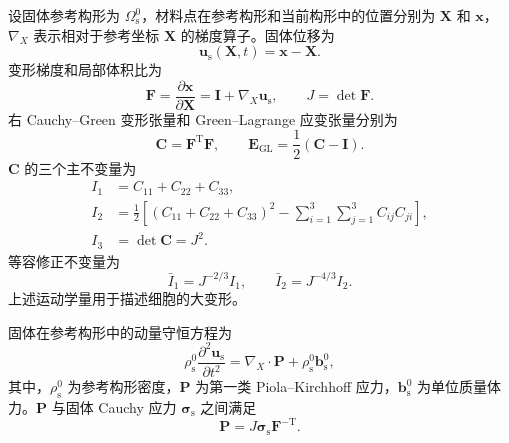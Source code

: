设固体参考构形为 $\Omega_{\mathrm s}^0$，材料点在参考构形和当前构形中的位置分别为 $\boldsymbol{X}$ 和 $\boldsymbol{x}$，$\nabla_{\!X}$ 表示相对于参考坐标 $\boldsymbol{X}$ 的梯度算子。固体位移为
\begin{equation}
\boldsymbol{u}_{\mathrm s}(\boldsymbol{X},t)
=
\boldsymbol{x}-\boldsymbol{X}.
\label{eq:ch2_solid_motion}
\end{equation}
变形梯度和局部体积比为
\begin{equation}
\boldsymbol{F}
=
\frac{\partial\boldsymbol{x}}{\partial\boldsymbol{X}}
=
\boldsymbol{I}
+
\nabla_{\!X}\boldsymbol{u}_{\mathrm s},
\qquad
J=\det\boldsymbol{F}.
\label{eq:ch2_deformation_gradient}
\end{equation}
右 Cauchy--Green 变形张量和 Green--Lagrange 应变张量分别为
\begin{equation}
\boldsymbol{C}
=
\boldsymbol{F}^{\mathrm T}\boldsymbol{F},
\qquad
\boldsymbol{E}_{\mathrm{GL}}
=
\frac{1}{2}\left(\boldsymbol{C}-\boldsymbol{I}\right).
\label{eq:ch2_strain_tensors}
\end{equation}
$\boldsymbol{C}$ 的三个主不变量为
\begin{equation}
\begin{aligned}
I_1
&=C_{11}+C_{22}+C_{33},
\\
I_2
&=
\frac{1}{2}
\left[
\left(C_{11}+C_{22}+C_{33}\right)^2
-
\sum_{i=1}^{3}\sum_{j=1}^{3}C_{ij}C_{ji}
\right],
\\
I_3
&=\det\boldsymbol{C}=J^2.
\end{aligned}
\label{eq:ch2_invariants}
\end{equation}
等容修正不变量为
\begin{equation}
\bar I_1=J^{-2/3}I_1,
\qquad
\bar I_2=J^{-4/3}I_2.
\label{eq:ch2_modified_invariants}
\end{equation}
上述运动学量用于描述细胞的大变形\cite{holzapfel2000nonlinear,ogden1997nonlinear,bonet2008nonlinear}。

固体在参考构形中的动量守恒方程为
\begin{equation}
\rho_{\mathrm s}^0
\frac{\partial^2\boldsymbol{u}_{\mathrm s}}{\partial t^2}
=
\nabla_{\!X}\cdot\boldsymbol{P}
+
\rho_{\mathrm s}^0\boldsymbol{b}_{\mathrm s}^0,
\label{eq:ch2_solid_momentum_reference}
\end{equation}
其中，$\rho_{\mathrm s}^0$ 为参考构形密度，$\boldsymbol{P}$ 为第一类 Piola--Kirchhoff 应力，$\boldsymbol{b}_{\mathrm s}^0$ 为单位质量体力。$\boldsymbol{P}$ 与固体 Cauchy 应力 $\boldsymbol{\sigma}_{\mathrm s}$ 之间满足
\begin{equation}
\boldsymbol{P}
=
J\boldsymbol{\sigma}_{\mathrm s}\boldsymbol{F}^{-\mathrm T}.
\label{eq:ch2_stress_transform}
\end{equation}

